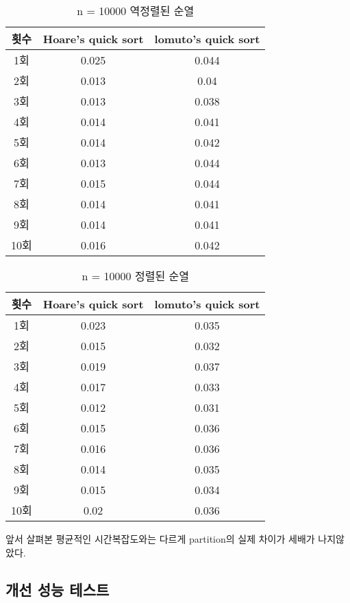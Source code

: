 \begin{table}[h!]
	\centering
	\begin{tabular}{|c|c|c|}
		\hline\hline
		횟수 & Hoare's quick sort & lomuto's quick sort \\ \hline
		1회 & 0.025 & 0.044 \\ \hline
		2회 & 0.013 & 0.04 \\ \hline
		3회 & 0.013 & 0.038 \\ \hline
		4회 & 0.014 & 0.041 \\ \hline
		5회 & 0.014 & 0.042 \\ \hline
		6회 & 0.013 & 0.044 \\ \hline
		7회 & 0.015 & 0.044 \\ \hline
		8회 & 0.014 & 0.041 \\ \hline
		9회 & 0.014 & 0.041 \\ \hline
		10회 & 0.016 & 0.042 \\ \hline
		\hline\hline
	\end{tabular}
	\caption{n = 10000 역정렬된 순열}
\end{table}


\begin{table}[h!]
	\centering
	\begin{tabular}{|c|c|c|}
		\hline\hline
		횟수 & Hoare's quick sort & lomuto's quick sort \\ \hline
		1회 & 0.023 & 0.035 \\ \hline
		2회 & 0.015 & 0.032 \\ \hline
		3회 & 0.019 & 0.037 \\ \hline
		4회 & 0.017 & 0.033 \\ \hline
		5회 & 0.012 & 0.031 \\ \hline
		6회 & 0.015 & 0.036 \\ \hline
		7회 & 0.016 & 0.036 \\ \hline
		8회 & 0.014 & 0.035 \\ \hline
		9회 & 0.015 & 0.034 \\ \hline
		10회 & 0.02 & 0.036 \\ \hline
		\hline\hline
	\end{tabular}
	\caption{n = 10000 정렬된 순열}
\end{table}

앞서 살펴본 평균적인 시간복잡도와는 다르게 partition의 실제 차이가 세배가 나지않았다.

\subsection{개선 성능 테스트}

